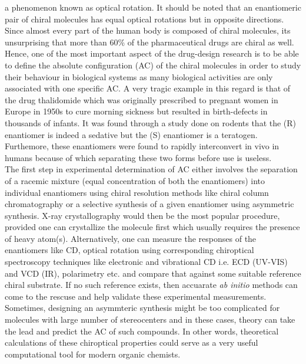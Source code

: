 a phenomenon known as optical rotation. It should be noted that an enantiomeric pair of chiral
molecules has equal optical rotations but in opposite directions.\\
Since almost every part of the human body is composed of chiral molecules, its unsurprising that
more than 60\% of the pharmaceutical drugs are chiral as well. Hence, one of the most 
important aspect of the drug-design research is to be able to define the absolute configuration 
(AC) of the chiral molecules in order to study their behaviour in  biological systems as 
many biological activities are only associated with one specific AC. A very tragic example
in this regard is that of the drug thalidomide which was originally prescribed to pregnant women in 
Europe in 1950s to cure morning sickness but resulted in birth-defects in thousands of 
infants. It was found through a study done on rodents that the (R) enantiomer is indeed 
a sedative but the (S) enantiomer is a teratogen\cite{}. Furthemore, these enantiomers were 
found to rapidly interconvert in vivo in humans\cite{} because of which separating 
these two forms before use is useless.
\\
The first step in experimental determination of AC either involves the separation of 
a racemic mixture (equal concentration of both the enantiomers) into individual enantiomers
using chiral resolution methods like chiral column chromatography or a selective synthesis
of a given enantiomer using asymmetric synthesis. X-ray crystallography would then be the 
most popular procedure, provided one can crystallize the molecule first which usually 
requires the presence of heavy atom(s). Alternatively, one can measure the responses of 
the enantiomers like CD, optical rotation using corresponding chiroptical spectroscopy
techniques like electronic and vibrational CD i.e. ECD (UV-VIS) and VCD (IR), polarimetry etc.
and compare that against some suitable reference chiral substrate. If no such reference
exists, then accuarate {\em ab initio} methods can come to the rescuse and help validate
these experimental measurements. Sometimes, designing an asymmteric synthesis might be  
too complicated for molecules with large number of stereocenters and in these cases,
theory can take the lead and predict the AC of such compounds. In other words, theoretical
calculations of these chiroptical properties could serve as a very useful 
computational tool for modern organic chemists.\\\\
